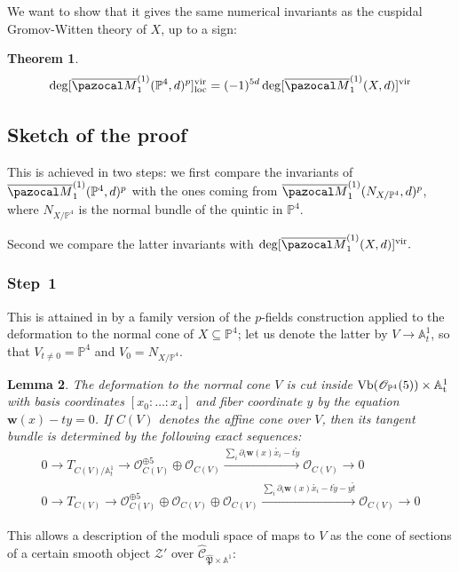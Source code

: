 \documentclass[11pt]{amsart}
\newcommand{\Mone}[3]{\overline{\pazocal M}^{(1)}_{#1}(#2,#3)}
\newcommand{\PP}{\mathbb P}
\newcommand{\OO}{\mathcal O}
\renewcommand{\to}{\rightarrow}
\newcommand{\Aaff}{\mathbb A}
\newcommand{\hC}{\widehat{\mathcal C}}
\newcommand{\hP}{\widehat{\mathfrak P}}
\newcommand{\w}{\mathbf{w}}
\theoremstyle{plain}
\newtheorem{thm}{Theorem}[section]
\newtheorem{lem}[thm]{Lemma}
\theoremstyle{definition}
\begin{document}
We want to show that it gives the same numerical invariants as the cuspidal Gromov-Witten theory of $X$, up to a sign:
\begin{thm}
 \[\deg[\Mone{1}{\PP^4}{d}^p]^{\rm{vir}}_{\rm{loc}}= (-1)^{5d}\deg[\Mone{1}{X}{d}]^{\rm{vir}}\]%
\end{thm}

\subsection{Sketch of the proof}
This is achieved in two steps: we first compare the invariants of $\Mone{1}{\PP^4}{d}^p$ with the ones coming from $\Mone{1}{N_{X/\PP^4}}{d}^p$, where $N_{X/\PP^4}$ is the normal bundle of the quintic in $\PP^4.$

Second we compare the latter invariants with $\deg[\Mone{1}{X}{d}]^{\rm{vir}}.$

\subsubsection*{Step~1}
This is attained in \cite[\S\S4-5]{CLpfields} by a family version of the $p$-fields construction applied to the deformation to the normal cone of $X\subseteq \PP^4$; let us denote the latter by $V\to\Aaff^1_t$, so that $V_{t\neq 0}=\PP^4$ and $V_0=N_{X/\PP^4}.$

\begin{lem}
 The deformation to the normal cone $V$ is cut inside $\rm{Vb}(\OO_{\PP^4}(5))\times\Aaff^1_t$ with basis coordinates $[x_0:\ldots:x_4]$ and fiber coordinate $y$ by the equation $\w(x)-ty=0$. If $C(V)$ denotes the affine cone over $V$, then its tangent bundle is determined by the following exact sequences:
 \begin{equation*}
  \begin{split}
   0\to T_{C(V)/\Aaff^1_t}\to\OO^{\oplus 5}_{C(V)}\oplus\OO_{C(V)}\xrightarrow{\sum_i\partial_i\w(x)\mathring{x_i}-t\mathring{y}}\OO_{C(V)}\to 0 \\
   0\to T_{C(V)}\to\OO^{\oplus 5}_{C(V)}\oplus\OO_{C(V)}\oplus\OO_{C(V)}\xrightarrow{\sum_i\partial_i\w(x)\mathring{x_i}-t\mathring{y}-y\mathring{t}}\OO_{C(V)}\to 0
  \end{split}
 \end{equation*}
\end{lem}
This allows a description of the moduli space of maps to $V$ as the cone of sections of a certain smooth object $\mathcal Z'$ over $\hC_{\hP\times\Aaff^1}$:
\end{document}
